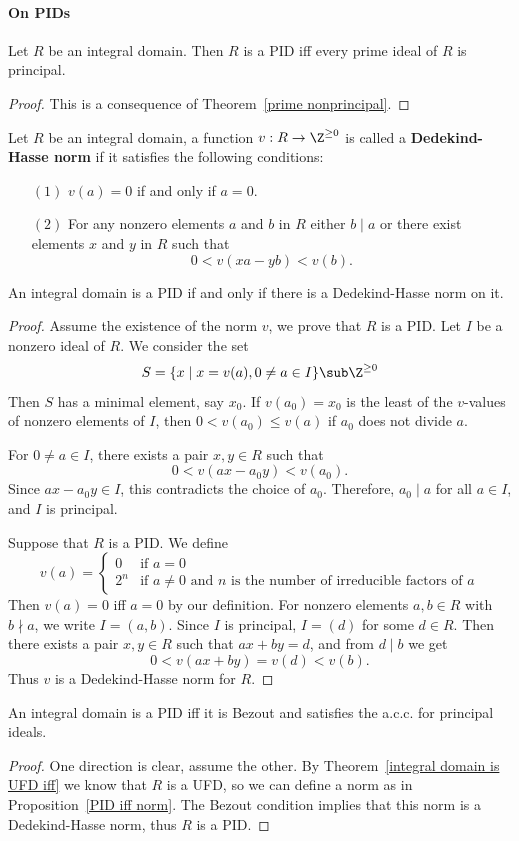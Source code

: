 \paragraph{On PIDs}
\begin{theorem}\label{PID iff prime principal}
Let $R$ be an integral domain. Then $R$ is a PID iff every prime ideal of $R$ is principal.
\end{theorem}
\begin{proof}
This is a consequence of Theorem~\ref{prime nonprincipal}.
\end{proof}
\begin{definition}
Let $R$ be an integral domain, a function $v:R\to\Z^{\geq 0}$ is called a \textbf{Dedekind-Hasse norm} if it satisfies the following conditions:
\begin{itemize}
\item[$(1)$] $v(a)=0$ if and only if $a=0$.
\item[$(2)$] For any nonzero elements $a$ and $b$ in $R$ either $b\mid a$ or there exist elements $x$ and $y$ in $R$ such that 
\[0<v(xa-yb)<v(b).\] 
\end{itemize}
\end{definition}
\begin{proposition}\label{PID iff norm}
An integral domain is a PID if and only if there is a Dedekind-Hasse norm on it.
\end{proposition}
\begin{proof}
Assume the existence of the norm $v$, we prove that $R$ is a PID. Let $I$ be a nonzero ideal of $R$. We consider the set
\[S=\{x\mid x=v(a),0\neq a\in I\}\sub\Z^{\geq0}\]
Then $S$ has a minimal element, say $x_0$. If $v(a_0)=x_0$ is the least of the $v$-values of nonzero elements of $I$, then $0<v(a_0)\leq v(a)$ if $a_0$ does not divide $a$.\par
For $0\neq a\in I$, there exists a pair $x,y\in R$ such that
\[0<v(ax-a_0y)<v(a_0).\]
Since $ax-a_0y\in I$, this contradicts the choice of $a_0$. Therefore, $a_0\mid a$ for all $a\in I$, and $I$ is principal.\par
Suppose that $R$ is a PID. We define
\[v(a)=\begin{cases}
0&\text{if $a=0$}\\
2^n&\text{if $a\neq0$ and $n$ is the number of irreducible factors of $a$}
\end{cases}\]
Then $v(a)=0$ iff $a=0$ by our definition. For nonzero elements $a,b\in R$ with $b\nmid a$, we write $I=(a,b)$. Since $I$ is principal, $I=(d)$ for some $d\in R$. Then there exists a pair $x,y\in R$ such that $ax+by=d$, and from $d\mid b$ we get
\[0<v(ax+by)=v(d)<v(b).\]
Thus $v$ is a Dedekind-Hasse norm for $R$.
\end{proof}
\begin{proposition}
An integral domain is a PID iff it is Bezout and satisfies the a.c.c. for principal ideals.
\end{proposition}
\begin{proof}
One direction is clear, assume the other. By Theorem~\ref{integral domain is UFD iff} we know that $R$ is a UFD, so we can define a norm as in Proposition~\ref{PID iff norm}. The Bezout condition implies that this norm is a Dedekind-Hasse norm, thus $R$ is a PID.
\end{proof}
